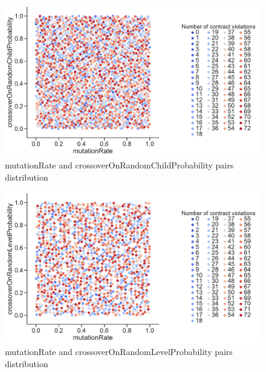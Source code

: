 \begin{figure}
	\centering
	\includegraphics[width=\textwidth]{images/PairsDistr/mutationRate_crossoverOnRandomChildProbability.pdf}
	\caption[mutationRate and crossoverOnRandomChildProbability pairs distribution]{mutationRate and crossoverOnRandomChildProbability pairs distribution}
	\label{fig:mutationRate_crossoverOnRandomChildProbability_pair}
\end{figure}
\begin{figure}
	\centering
	\includegraphics[width=\textwidth]{images/PairsDistr/mutationRate_crossoverOnRandomLevelProbability.pdf}
	\caption[mutationRate and crossoverOnRandomLevelProbability pairs distribution]{mutationRate and crossoverOnRandomLevelProbability pairs distribution}
	\label{fig:mutationRate_crossoverOnRandomLevelProbability_pair}
\end{figure}
